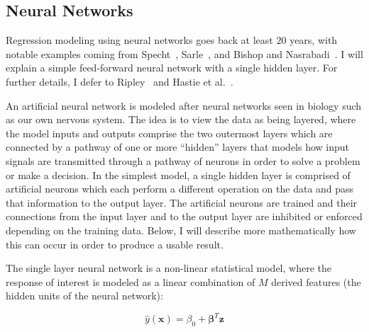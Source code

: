 \subsection{Neural Networks}


Regression modeling using neural networks goes back at least $20$ years, with notable examples coming from Specht~\cite{Specht1991}, Sarle~\cite{Sarle1994}, and Bishop and Nasrabadi~\cite{BishopNasrabadi2006}.
%
I will explain a simple feed-forward neural network with a single hidden layer.
%
For further details, I defer to Ripley~\cite{Ripley1996} and Hastie et al.~\cite{HastieTibshiraniFriedman2008}.

An artificial neural network is modeled after neural networks seen in biology such as our own nervous system.
%
The idea is to view the data as being layered, where the model inputs and outputs comprise the two outermost layers which are connected by a pathway of one or more ``hidden'' layers that models how input signals are transmitted through a pathway of neurons in order to solve a problem or make a decision.
%
In the simplest model, a single hidden layer is comprised of artificial neurons which each perform a different operation on the data and pass that information to the output layer.
%
The artificial neurons are trained and their connections from the input layer and to the output layer are inhibited or enforced depending on the training data.
%
Below, I will describe more mathematically how this can occur in order to produce a usable result.

The single layer neural network is a non-linear statistical model, where the response of interest is modeled as a linear combination of $M$ derived features (the hidden units of the neural network):

\begin{equation}
\hat{y}(\mathbf{x}) = \beta_0 + \boldsymbol{\beta}^T \mathbf{z}
\end{equation}

